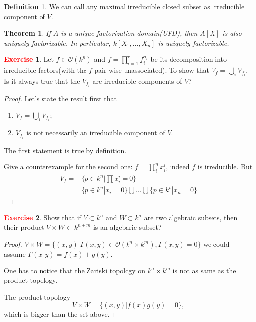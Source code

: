 \documentclass[12pt,a4paper,english]{article}
\theoremstyle{plain}
\newtheorem{thm}{Theorem}[section]
\theoremstyle{definition}
\newtheorem{defi}{Definition}
\newtheorem{exercise}{\textbf{\textcolor{red}{Exercise}}}
\theoremstyle{remark}
\begin{document}
\begin{defi}
We can call any maximal irreducible closed subset as irreducible component of $V$. 
\end{defi}
\begin{thm}
If $A$ is a unique factorization domain(UFD), then $A[X]$ is also uniquely factorizable. In particular, $k[X_{1},...,X_{n}]$ is uniquely factorizable. 
\end{thm}
\begin{exercise}
Let $f\in\mathcal{O}(k^{n})$ and $f=\prod^{r}_{i=1}f^{n_{i}}_{i}$ be its decomposition into irreducible factors(with the $f$ pair-wise unassociated). To show that $V_{f}=\bigcup_{i} V_{f_{i}}$. Is it always true that the $V_{f_{i}}$ are irreducible components of $V$?
\end{exercise}
\begin{tcolorbox}
\begin{proof}
Let's state the result first that 
\begin{enumerate}
    \item $V_{f}=\bigcup_{i}V_{f_{i}}$;
    \item $V_{f_{i}}$ is not necessarily an irreducible component of $V$.
\end{enumerate}
The first statement is true by definition.

Give a counterexample for the second one: $f=\prod_{i}^{n} x_{i}^{i}$, indeed $f$ is irreducible. But
\begin{align*}
    V_{f}=&\{p\in k^{n}|\prod x_{i}^{i}=0\}\\
    =&\{p\in k^{n}|x_{i}=0\}\bigcup...\bigcup\{p\in k^{n}|x_{n}=0\}
\end{align*}
\end{proof}
\end{tcolorbox}
\begin{exercise}
Show that if $V\subset k^{n}$ and $W\subset k^{n}$ are two algebraic subsets, then their product $V\times W\subset k^{n+m}$ is an algebaric subset?
\end{exercise}
\begin{tcolorbox}
\begin{proof}
$V\times W=\{(x,y)|\Gamma(x,y)\in\mathcal{O}(k^{n}\times k^{m}), \Gamma(x,y)=0\}$
we could assume $\Gamma(x,y)=f(x)+g(y)$.


One has to notice that the Zariski topology on $k^{n}\times k^{m}$ is not as same as the product topology.

The product topology 
\begin{equation*}
    V\times W=\{(x,y)| f(x)g(y)=0\},
\end{equation*}
which is bigger than the set  above.
\end{proof}
\end{tcolorbox}
\end{document}
